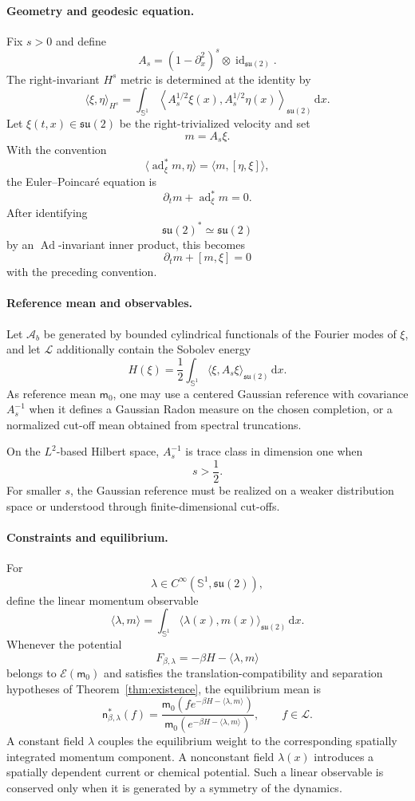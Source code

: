 \documentclass[11pt,reqno]{amsart}
\begin{document}
\paragraph{\bfseries Geometry and geodesic equation.}
Fix $s>0$ and define
\[
A_s
=
(1-\partial_x^2)^s
\otimes
\operatorname{id}_{\mathfrak{su}(2)}.
\]
The right-invariant $H^s$ metric is determined at the identity by
\[
\langle\xi,\eta\rangle_{H^s}
=
\int_{\mathbb S^1}
\left\langle
A_s^{1/2}\xi(x),A_s^{1/2}\eta(x)
\right\rangle_{\mathfrak{su}(2)}
\,\mathrm dx.
\]
Let $\xi(t,x)\in\mathfrak{su}(2)$ be the right-trivialized velocity and
set
\[
m=A_s\xi.
\]
With the convention
\[
\langle\operatorname{ad}_\xi^*m,\eta\rangle
=
\langle m,[\eta,\xi]\rangle,
\]
the Euler--Poincaré equation is
\[
\partial_t m+\operatorname{ad}_\xi^*m=0.
\]
After identifying
\[
\mathfrak{su}(2)^*\simeq\mathfrak{su}(2)
\]
by an $\operatorname{Ad}$-invariant inner product, this becomes
\[
\partial_t m+[m,\xi]=0
\]
with the preceding convention.

\paragraph{\bfseries Reference mean and observables.}
Let $\mathcal A_b$ be generated by bounded cylindrical functionals of
the Fourier modes of $\xi$, and let $\mathcal L$ additionally contain
the Sobolev energy
\[
H(\xi)
=
\frac12
\int_{\mathbb S^1}
\langle\xi,A_s\xi\rangle_{\mathfrak{su}(2)}
\,\mathrm dx.
\]
As reference mean $\mathsf m_0$, one may use a centered Gaussian
reference with covariance $A_s^{-1}$ when it defines a Gaussian Radon
measure on the chosen completion, or a normalized cut-off mean obtained
from spectral truncations.

On the $L^2$-based Hilbert space,
$A_s^{-1}$ is trace class in dimension one when
\[
s>\frac12.
\]
For smaller $s$, the Gaussian reference must be realized on a weaker
distribution space or understood through finite-dimensional cut-offs.

\paragraph{\bfseries Constraints and equilibrium.}
For
\[
\lambda\in
C^\infty(\mathbb S^1,\mathfrak{su}(2)),
\]
define the linear momentum observable
\[
\langle\lambda,m\rangle
=
\int_{\mathbb S^1}
\langle\lambda(x),m(x)\rangle_{\mathfrak{su}(2)}
\,\mathrm dx.
\]
Whenever the potential
\[
F_{\beta,\lambda}
=
-\beta H-\langle\lambda,m\rangle
\]
belongs to $\mathcal E(\mathsf m_0)$ and satisfies the
translation-compatibility and separation hypotheses of
Theorem~\ref{thm:existence}, the equilibrium mean is
\[
\boxed{
\mathsf n_{\beta,\lambda}^*(f)
=
\frac{
\mathsf m_0
\left(
f e^{-\beta H-\langle\lambda,m\rangle}
\right)
}{
\mathsf m_0
\left(
e^{-\beta H-\langle\lambda,m\rangle}
\right)
},
\qquad
f\in\mathcal L.
}
\]
A constant field $\lambda$ couples the equilibrium weight to the
corresponding spatially integrated momentum component. A nonconstant
field $\lambda(x)$ introduces a spatially dependent current or chemical
potential. Such a linear observable is conserved only when it is
generated by a symmetry of the dynamics.
\end{document}
